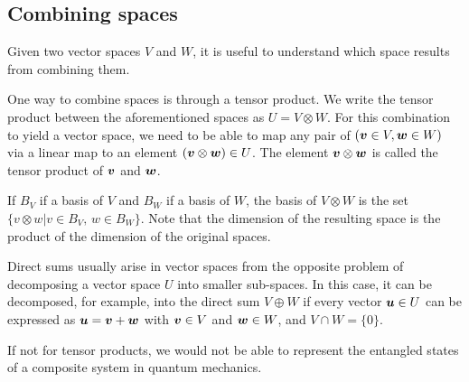 \subsection{Combining spaces}
Given two vector spaces $V$ and $W$, it is useful to understand which space results from combining them.

One way to combine spaces is through a tensor product. We write the tensor product between the aforementioned spaces as $U = V\otimes W$. For this combination to yield a vector space, we need to be able to map any pair of $(\boldsymbol{v}\in V,\boldsymbol{w}\in W)$ via a linear map to an element $(\boldsymbol{v}\otimes \boldsymbol{w}) \in U$. The element $\boldsymbol{v}\otimes \boldsymbol{w}$ is called the tensor product of $\boldsymbol{v}$ and $\boldsymbol{w}$.

If $B_V$ if a basis of $V$ and $B_W$ if a basis of $W$, the basis of $V \otimes W$ is the set $\{v \otimes w \vert v \in B_V ,\,w\in B_W \}$. Note that the dimension of the resulting space is the product of the dimension of the original spaces.

Direct sums usually arise in vector spaces from the opposite problem of decomposing a vector space $U$ into smaller sub-spaces. 
In this case, it can be decomposed, for example, into the direct sum $V \oplus W$ if every vector $\boldsymbol{u}\in U$ can be expressed as $\boldsymbol{u} = \boldsymbol{v} + \boldsymbol{w}$ with $\boldsymbol{v} \in V$ and $\boldsymbol{w} \in W$, and $V \cap W = \{0\}$.
\begin{JTD}

\forceindent If not for tensor products, we would not be able to represent the entangled states of a composite system in quantum mechanics. %


\end{JTD}

